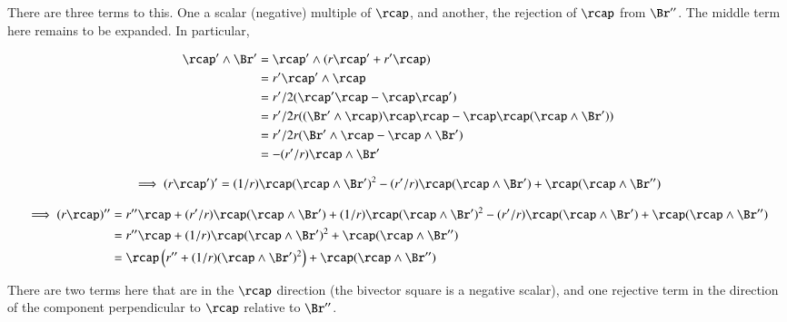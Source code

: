 \documentclass{article}      %
\newcommand{\BrPrimeRej}[0]{\rcap(\rcap \wedge \Br')}
\begin{document}
There are three terms to this.  One a scalar (negative) multiple of $\rcap$, and another, the rejection of $\rcap$ from $\Br''$.  The middle term here remains to be expanded.  In particular,

\begin{align*}
\rcap' \wedge \Br' 
   &= \rcap' \wedge (r\rcap' + r'\rcap) \\
   &= r' \rcap' \wedge \rcap \\
   &= r'/2 (\rcap'\rcap - \rcap\rcap') \\
   &= r'/2r ((\Br' \wedge \rcap)\rcap\rcap - \rcap\rcap(\rcap \wedge \Br')) \\
   &= r'/2r (\Br' \wedge \rcap - \rcap \wedge \Br') \\
   &= -(r'/r) \rcap \wedge \Br' \\
\end{align*}

\begin{align*}
\implies
(r\rcap')' 
   &= 
(1/r)\rcap(\rcap \wedge \Br')^2 
-(r'/r)\BrPrimeRej 
+\rcap(\rcap \wedge \Br'') \\
\end{align*}

\begin{align*}
\implies
(r\rcap)'' 
   &= r''\rcap 
+(r'/r)\BrPrimeRej
+(1/r)\rcap(\rcap \wedge \Br')^2 
-(r'/r)\BrPrimeRej
+\rcap(\rcap \wedge \Br'') \\
   &= r''\rcap 
    +(1/r)\rcap(\rcap \wedge \Br')^2 
    +\rcap(\rcap \wedge \Br'') \\
   &= 
\rcap \left(  r'' +(1/r)(\rcap \wedge \Br')^2\right) +    \rcap(\rcap \wedge \Br'') \\
\end{align*}

There are two terms here that are in the $\rcap$ direction (the bivector square is a negative scalar), and
one rejective term in the direction of the component perpendicular to $\rcap$ relative to $\Br''$.
\end{document}
